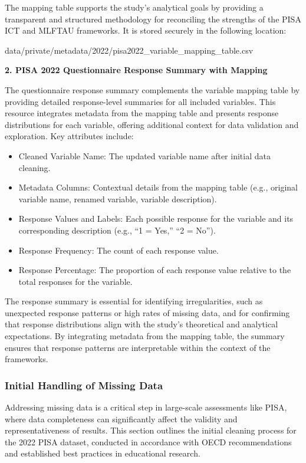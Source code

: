 \documentclass[
]{article}
\begin{document}
The mapping table supports the study's analytical goals by providing a
transparent and structured methodology for reconciling the strengths of
the PISA ICT and MLFTAU frameworks. It is stored securely in the
following location:

data/private/metadata/2022/pisa2022\_variable\_mapping\_table.csv

\textbf{2. PISA 2022 Questionnaire Response Summary with Mapping}

The questionnaire response summary complements the variable mapping
table by providing detailed response-level summaries for all included
variables. This resource integrates metadata from the mapping table and
presents response distributions for each variable, offering additional
context for data validation and exploration. Key attributes include:

\begin{itemize}
\item
  Cleaned Variable Name: The updated variable name after initial data
  cleaning.
\item
  Metadata Columns: Contextual details from the mapping table (e.g.,
  original variable name, renamed variable, variable description).
\item
  Response Values and Labels: Each possible response for the variable
  and its corresponding description (e.g., ``1 = Yes,'' ``2 = No'').
\item
  Response Frequency: The count of each response value.
\item
  Response Percentage: The proportion of each response value relative to
  the total responses for the variable.
\end{itemize}

The response summary is essential for identifying irregularities, such
as unexpected response patterns or high rates of missing data, and for
confirming that response distributions align with the study's
theoretical and analytical expectations. By integrating metadata from
the mapping table, the summary ensures that response patterns are
interpretable within the context of the frameworks.

\hypertarget{initial-handling-of-missing-data}{%
\subsubsection{Initial Handling of Missing
Data}\label{initial-handling-of-missing-data}}

Addressing missing data is a critical step in large-scale assessments
like PISA, where data completeness can significantly affect the validity
and representativeness of results. This section outlines the initial
cleaning process for the 2022 PISA dataset, conducted in accordance with
OECD recommendations and established best practices in educational
research.
\end{document}
